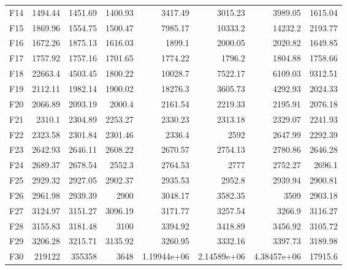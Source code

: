 \begin{table}[t]
{\begin{tabular}{lrrrrrrr}
F14 & 1494.44 & 1451.69 & 1400.93 & 3417.49 & 3015.23 & 3989.05 & 1615.04\\
F15 & 1869.96 & 1554.75 & 1500.47 & 7985.17 & 10333.2 & 14232.2 & 2193.77\\
F16 & 1672.26 & 1875.13 & 1616.03 & 1899.1 & 2000.05 & 2020.82 & 1649.85\\
F17 & 1757.92 & 1757.16 & 1701.65 & 1774.22 & 1796.2 & 1804.88 & 1758.66\\
F18 & 22663.4 & 4503.45 & 1800.22 & 10028.7 & 7522.17 & 6109.03 & 9312.51\\
F19 & 2112.11 & 1982.14 & 1900.02 & 18276.3 & 3605.73 & 4292.93 & 2024.33\\
F20 & 2066.89 & 2093.19 & 2000.4 & 2161.54 & 2219.33 & 2195.91 & 2076.18\\
F21 & 2310.1 & 2304.89 & 2253.27 & 2330.23 & 2313.18 & 2329.07 & 2241.93\\
F22 & 2323.58 & 2301.84 & 2301.46 & 2336.4 & 2592 & 2647.99 & 2292.39\\
F23 & 2642.93 & 2646.11 & 2608.22 & 2670.57 & 2754.13 & 2780.86 & 2646.28\\
F24 & 2689.37 & 2678.54 & 2552.3 & 2764.53 & 2777 & 2752.27 & 2696.1\\
F25 & 2929.32 & 2927.05 & 2902.37 & 2935.53 & 2952.8 & 2939.94 & 2900.81\\
F26 & 2961.98 & 2939.39 & 2900 & 3048.17 & 3582.35 & 3509 & 2903.18\\
F27 & 3124.97 & 3151.27 & 3096.19 & 3171.77 & 3257.54 & 3266.9 & 3116.27\\
F28 & 3155.83 & 3181.48 & 3100 & 3394.92 & 3418.89 & 3456.92 & 3105.72\\
F29 & 3206.28 & 3215.71 & 3135.92 & 3260.95 & 3332.16 & 3397.73 & 3189.98\\
F30 & 219122 & 355358 & 3648 & 1.19944e+06 & 2.14589e+06 & 4.38457e+06 & 17915.6\\
\bottomrule
\end{tabular}}
\end{table}
